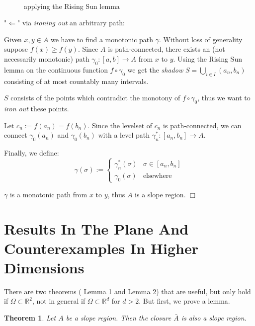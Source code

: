 \documentclass[11pt,twoside,twocolumn,a4paper]{article}
\theoremstyle{plain}
\newtheorem{thm}{Theorem}[section] %
\theoremstyle{definition}
\begin{document}
$~$

\begin{figure}
\centering
\def\svgwidth{0.4\textwidth}

\caption{applying the Rising Sun lemma}
\label{fig:lemma_1}
\end{figure}

"$\Leftarrow$" via \emph{ironing out} an arbitrary path:

Given $x, y \in A$ we have to find a monotonic path $\gamma$.
Without loss of generality suppose $f(x) \geq f(y)$.
Since $A$ is path-connected, there exists an (not necessarily monotonic) path $\gamma_0: [a,b] \to A$ from $x$ to $y$.
Using the Rising Sun lemma \cite{riesz1932theoreme} on the continuous function $f \circ \gamma_0$ we get the \emph{shadow} $S = \bigcup_{i \in I} (a_n, b_n)$ consisting of at most countably many intervals.

$S$ consists of the points which contradict the monotony of $f \circ \gamma_0$, thus we want to \emph{iron out} these points.

Let $c_n := f(a_n) = f(b_n)$. Since the levelset of $c_n$ is path-connected, we can connect $\gamma_0(a_n)$ and $\gamma_0(b_n)$ with a level path $\gamma_n^* : [a_n, b_n] \to A.$

Finally, we define:
\begin{equation*}
\gamma(\sigma) :=
\begin{cases}
\gamma_n^*(\sigma) & \sigma \in [a_n, b_n] \\
\gamma_0(\sigma) & \text{elsewhere}
\end{cases}
\end{equation*}

$\gamma$ is a monotonic path from $x$ to $y$, thus $A$ is a slope region.
\hfill $\Box$



\section{Results In The Plane And Counterexamples In Higher Dimensions}

There are two theorems (\;\!\!\cite{kropatsch2019computing} Lemma 1 and \cite{kropatsch2019computing} Lemma 2) that are useful, but only hold if $\Omega \subset \mathbb R^2$, not in general if $\Omega \subset \mathbb R^d$ for $d > 2$.
But first, we prove a lemma.

\begin{thm}
Let $A$ be a slope region.
Then the closure $\bar A$ is also a slope region.
\end{thm}
\end{document}
